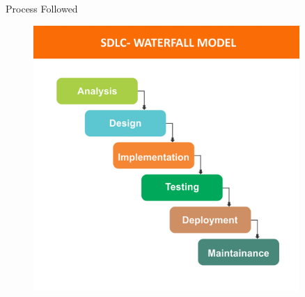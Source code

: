 \documentclass[final]{beamer}
\newlength{\sepwid}
\newlength{\onecolwid}
\newlength{\twocolwid}
\begin{document}
\begin{frame}
\begin{columns}[t]
\begin{column}{\onecolwid}
\begin{exampleblock}{Process Followed}
\begin{figure}
\includegraphics[width=1\linewidth]{waterfall-jpg.jpg}
\end{figure}
\end{exampleblock}


\end{column} %

\begin{column}{\sepwid}\end{column} %

\begin{column}{\twocolwid} %

\begin{columns}[t,totalwidth=\twocolwid] %

\begin{column}{\onecolwid}\vspace{-.74in} %



\end{column}
\end{columns}
\end{column}
\end{columns}
\end{frame}
\end{document}
